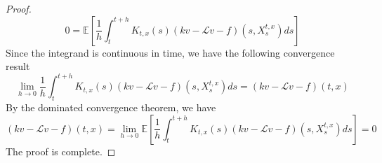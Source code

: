 \documentclass{article}
\begin{document}
\begin{proof}
\begin{equation*}
0=\mathbb{E}\left[\frac{1}{h}\int^{t+h}_tK_{t,x}(s)(kv-\mathcal{L}v-f)(s,X_s^{t,x})ds\right]
\end{equation*}
Since the integrand is continuous in time, we have the following convergence result
\begin{equation*}
\lim_{h\rightarrow0}\frac{1}{h}\int^{t+h}_tK_{t,x}(s)(kv-\mathcal{L}v-f)(s,X_s^{t,x})ds=(kv-\mathcal{L}v-f)(t,x)
\end{equation*}
By the dominated convergence theorem, we have
\begin{equation*}
(kv-\mathcal{L}v-f)(t,x)=\lim_{h\rightarrow0}\mathbb{E}\left[\frac{1}{h}\int^{t+h}_tK_{t,x}(s)(kv-\mathcal{L}v-f)(s,X_s^{t,x})ds\right]=0
\end{equation*}
The proof is complete.
\end{proof}
\end{document}
